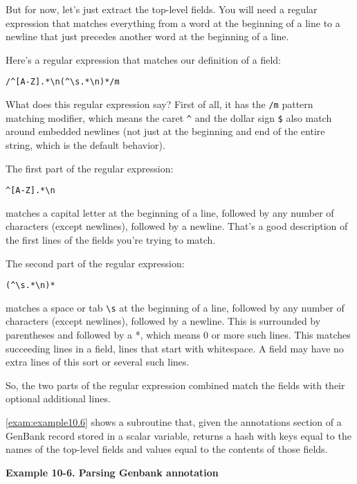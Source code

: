 But for now, let's just extract the top-level fields. You will need a regular expression that matches everything from a word at the beginning of a line to a newline that just precedes another word at the beginning of a line.

Here's a regular expression that matches our definition of a field: 

\begin{lstlisting}
/^[A-Z].*\n(^\s.*\n)*/m
\end{lstlisting}

What does this regular expression say? First of all, it has the \verb|/m| pattern matching modifier, which means the caret \verb|^| and the dollar sign \verb|$| also match around embedded newlines (not just at the beginning and end of the entire string, which is the default behavior).

The first part of the regular expression:
  
\begin{lstlisting}
^[A-Z].*\n
\end{lstlisting}

matches a capital letter at the beginning of a line, followed by any number of characters (except newlines), followed by a newline. That's a good description of the first lines of the fields you're trying to match.

The second part of the regular expression:
  
\begin{lstlisting}
(^\s.*\n)*
\end{lstlisting}

matches a space or tab \verb|\s| at the beginning of a line, followed by any number of characters (except newlines), followed by a newline. This is surrounded by parentheses and followed by a *, which means 0 or more such lines. This matches succeeding lines in a field, lines that start with whitespace. A field may have no extra lines of this sort or several such lines.

So, the two parts of the regular expression combined match the fields with their optional additional lines.

\autoref{exam:example10.6} shows a subroutine that, given the annotations section of a GenBank record stored in a scalar variable, returns a hash with keys equal to the names of the top-level fields and values equal to the contents of those fields. 

\textbf{Example 10-6. Parsing Genbank annotation}



